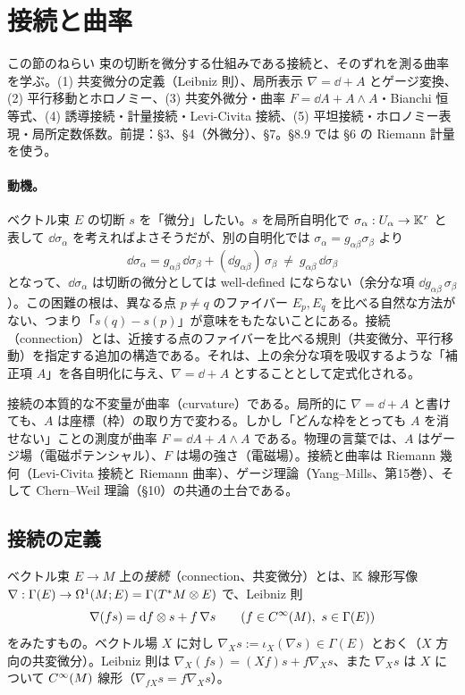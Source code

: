 \section{接続と曲率}
\label{C:sec8}
\begin{goalbox}{この節のねらい}
束の切断を微分する仕組みである接続と、そのずれを測る曲率を学ぶ。(1) 共変微分の定義（Leibniz 則）、局所表示 $\nabla=\dd+A$ とゲージ変換、(2) 平行移動とホロノミー、(3) 共変外微分・曲率 $F=\dd A+A\wedge A$・Bianchi 恒等式、(4) 誘導接続・計量接続・Levi-Civita 接続、(5) 平坦接続・ホロノミー表現・局所定数係数。前提：§3、§4（外微分）、§7。§8.9 では §6 の Riemann 計量を使う。
\end{goalbox}

\paragraph{動機。}ベクトル束 $E$ の切断 $s$ を「微分」したい。$s$ を局所自明化で $\sigma_\alpha:U_\alpha\to\mathbb K^r$ と表して $\dd\sigma_\alpha$ を考えればよさそうだが、別の自明化では $\sigma_\alpha=g_{\alpha\beta}\sigma_\beta$ より
\[
\dd\sigma_\alpha=g_{\alpha\beta}\,\dd\sigma_\beta+(\dd g_{\alpha\beta})\,\sigma_\beta\ \ne\ g_{\alpha\beta}\,\dd\sigma_\beta
\]
となって、$\dd\sigma_\alpha$ は切断の微分としては well-defined にならない（余分な項 $\dd g_{\alpha\beta}\,\sigma_\beta$）。この困難の根は、異なる点 $p\ne q$ のファイバー $E_p,E_q$ を比べる自然な方法がない、つまり「$s(q)-s(p)$」が意味をもたないことにある。接続（connection）とは、近接する点のファイバーを比べる規則（共変微分、平行移動）を指定する追加の構造である。それは、上の余分な項を吸収するような「補正項 $A$」を各自明化に与え、$\nabla=\dd+A$ とすることとして定式化される。

接続の本質的な不変量が曲率（curvature）である。局所的に $\nabla=\dd+A$ と書けても、$A$ は座標（枠）の取り方で変わる。しかし「どんな枠をとっても $A$ を消せない」ことの測度が曲率 $F=\dd A+A\wedge A$ である。物理の言葉では、$A$ はゲージ場（電磁ポテンシャル）、$F$ は場の強さ（電磁場）。接続と曲率は Riemann 幾何（Levi-Civita 接続と Riemann 曲率）、ゲージ理論（Yang--Mills、第15巻）、そして Chern--Weil 理論（§10）の共通の土台である。

\subsection{接続の定義}
\label{C:ss:def}
\begin{defn}[接続]\label{C:def:conn}
ベクトル束 $E\to M$ 上の\emph{接続}（connection、共変微分）とは、$\mathbb K$ 線形写像 $\nabla:\Gamma(E)\to\Omega^1(M;E)=\Gamma(T^*M\otimes E)$ で、Leibniz 則
\[
\nabla(fs)=\mathrm{d} f\otimes s+f\,\nabla s\qquad(f\in C^\infty(M),\ s\in\Gamma(E))
\]
をみたすもの。ベクトル場 $X$ に対し $\nabla_Xs:=\iota_X(\nabla s)\in\Gamma(E)$ とおく（$X$ 方向の共変微分）。Leibniz 則は $\nabla_X(fs)=(Xf)s+f\nabla_Xs$、また $\nabla_X s$ は $X$ について $C^\infty(M)$ 線形（$\nabla_{fX}s=f\nabla_Xs$）。
\end{defn}

